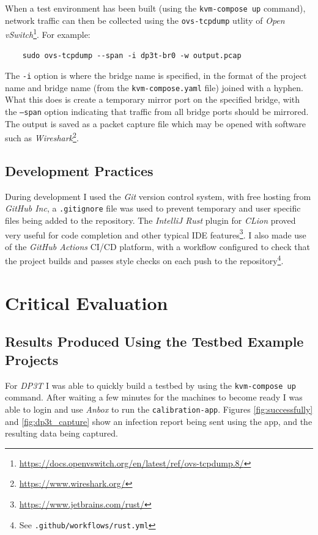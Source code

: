 \documentclass[
    author={Jacob Daniel Halsey},
    supervisor={Prof. Awais Rashid},
    degree={BSc},
    title={Building a Testbed for Evaluating Privacy Enhancing Technologies  (PETs)},
    subtitle={},
    type={software development},
    year={2021}
]{dissertation}
\begin{document}
When a test environment has been built (using the \texttt{kvm-compose up} command), network
traffic can then be collected using the \texttt{ovs-tcpdump} utlity of 
\emph{Open vSwitch}\footnote{\url{https://docs.openvswitch.org/en/latest/ref/ovs-tcpdump.8/}}.
For example:

\begin{verbatim}
	sudo ovs-tcpdump --span -i dp3t-br0 -w output.pcap
\end{verbatim}

The \texttt{-i} option is where the bridge name is specified, in the format of the project name
and bridge name (from the \texttt{kvm-compose.yaml} file) joined with a hyphen.
What this does is create a temporary mirror port on the specified bridge, with the \texttt{--span}
option indicating that traffic from all bridge ports should be mirrored. The output is saved as a
packet capture file which may be opened with software such as 
\emph{Wireshark}\footnote{\url{https://www.wireshark.org/}}.

\section{Development Practices}

During development I used the \emph{Git} version control system, with free hosting from \emph{GitHub Inc},
a \texttt{.gitignore} file was used to prevent temporary and user specific files being added to the
repository.
The \emph{IntelliJ Rust} plugin for \emph{CLion} proved very useful for code completion and other typical
IDE features\footnote{\url{https://www.jetbrains.com/rust/}}.
I also made use of the \emph{GitHub Actions} CI/CD platform, with a workflow configured to check that
the project builds and passes style checks on each push to the repository\footnote{See 
\texttt{.github/workflows/rust.yml}}. 

\chapter{Critical Evaluation}
\label{chap:evaluation}

\section{Results Produced Using the Testbed Example Projects}
\label{sect:results}

For \emph{DP3T} I was able to quickly build a testbed by using the
\texttt{kvm-compose up} command. After waiting a few minutes for the machines to become ready
I was able to login and use \emph{Anbox} to run the \texttt{calibration-app}. Figures
\ref{fig:successfully} and \ref{fig:dp3t_capture} show an infection report being sent using the
app, and the resulting data being captured. \\
\end{document}
